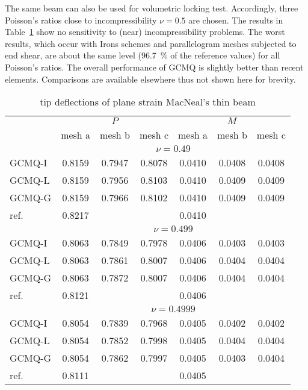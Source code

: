 \documentclass[3p,sort&compress,review,11pt]{elsarticle}
\newcommand*{\tabref}[1]{Table~\ref{#1}}
\begin{document}
The same beam can also be used for volumetric locking test. Accordingly, three Poisson's ratios close to incompressibility $\nu=0.5$ are chosen. The results in \tabref{table:macneals_beam_volumetric} show no sensitivity to (near) incompressibility problems. The worst results, which occur with Irons schemes and parallelogram meshes subjected to end shear, are about the same level (\SI{96.7}{\percent} of the reference values) for all Poisson's ratios. The overall performance of GCMQ is slightly better than recent elements. Comparisons are available elsewhere \citep{Cen2015} thus not shown here for brevity.
\begin{table}[H]
\centering\scriptsize
\caption{tip deflections of plane strain MacNeal's thin beam}\label{table:macneals_beam_volumetric}
\begin{tabular}{lcccccc}
	\toprule
	                     & \multicolumn{3}{c}{$P$}  & \multicolumn{3}{c}{$M$}  \\
	                     & mesh a & mesh b & mesh c & mesh a & mesh b & mesh c \\ \midrule
	                     &           \multicolumn{6}{c}{$\nu=0.49$}            \\
	GCMQ-I               & 0.8159 & 0.7947 & 0.8078 & 0.0410 & 0.0408 & 0.0408 \\
	GCMQ-L               & 0.8159 & 0.7956 & 0.8103 & 0.0410 & 0.0409 & 0.0409 \\
	GCMQ-G               & 0.8159 & 0.7966 & 0.8102 & 0.0410 & 0.0409 & 0.0409 \\
	ref.                 & 0.8217 &        &        & 0.0410 &        &        \\ \midrule
	                     &           \multicolumn{6}{c}{$\nu=0.499$}           \\
	GCMQ-I               & 0.8063 & 0.7849 & 0.7978 & 0.0406 & 0.0403 & 0.0403 \\
	GCMQ-L               & 0.8063 & 0.7861 & 0.8007 & 0.0406 & 0.0404 & 0.0404 \\
	GCMQ-G               & 0.8063 & 0.7872 & 0.8007 & 0.0406 & 0.0404 & 0.0404 \\
	ref.                 & 0.8121 &        &        & 0.0406 &        &        \\ \midrule
	                     &          \multicolumn{6}{c}{$\nu=0.4999$}           \\
	GCMQ-I               & 0.8054 & 0.7839 & 0.7968 & 0.0405 & 0.0402 & 0.0402 \\
	GCMQ-L               & 0.8054 & 0.7852 & 0.7998 & 0.0405 & 0.0404 & 0.0404 \\
	GCMQ-G               & 0.8054 & 0.7862 & 0.7997 & 0.0405 & 0.0403 & 0.0404 \\
	ref. \citep{Cen2015} & 0.8111 &        &        & 0.0405 &        &        \\ \bottomrule
\end{tabular}
\end{table} 
\end{document}
